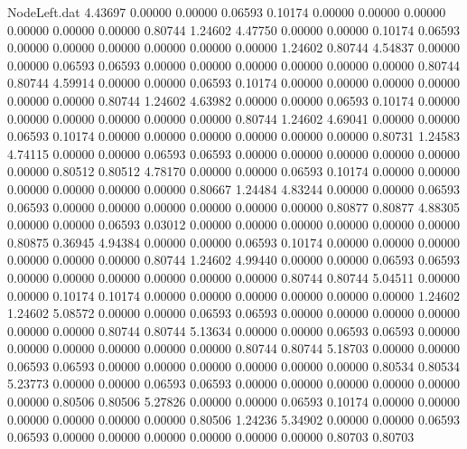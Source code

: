 \begin{filecontents}{NodeLeft.dat}
   4.43697    0.00000    0.00000     0.06593    0.10174    0.00000    0.00000    0.00000    0.00000    0.00000    0.00000    0.80744    1.24602
   4.47750    0.00000    0.00000     0.10174    0.06593    0.00000    0.00000    0.00000    0.00000    0.00000    0.00000    1.24602    0.80744
   4.54837    0.00000    0.00000     0.06593    0.06593    0.00000    0.00000    0.00000    0.00000    0.00000    0.00000    0.80744    0.80744
   4.59914    0.00000    0.00000     0.06593    0.10174    0.00000    0.00000    0.00000    0.00000    0.00000    0.00000    0.80744    1.24602
   4.63982    0.00000    0.00000     0.06593    0.10174    0.00000    0.00000    0.00000    0.00000    0.00000    0.00000    0.80744    1.24602
   4.69041    0.00000    0.00000     0.06593    0.10174    0.00000    0.00000    0.00000    0.00000    0.00000    0.00000    0.80731    1.24583
   4.74115    0.00000    0.00000     0.06593    0.06593    0.00000    0.00000    0.00000    0.00000    0.00000    0.00000    0.80512    0.80512
   4.78170    0.00000    0.00000     0.06593    0.10174    0.00000    0.00000    0.00000    0.00000    0.00000    0.00000    0.80667    1.24484
   4.83244    0.00000    0.00000     0.06593    0.06593    0.00000    0.00000    0.00000    0.00000    0.00000    0.00000    0.80877    0.80877
   4.88305    0.00000    0.00000     0.06593    0.03012    0.00000    0.00000    0.00000    0.00000    0.00000    0.00000    0.80875    0.36945
   4.94384    0.00000    0.00000     0.06593    0.10174    0.00000    0.00000    0.00000    0.00000    0.00000    0.00000    0.80744    1.24602
   4.99440    0.00000    0.00000     0.06593    0.06593    0.00000    0.00000    0.00000    0.00000    0.00000    0.00000    0.80744    0.80744
   5.04511    0.00000    0.00000     0.10174    0.10174    0.00000    0.00000    0.00000    0.00000    0.00000    0.00000    1.24602    1.24602
   5.08572    0.00000    0.00000     0.06593    0.06593    0.00000    0.00000    0.00000    0.00000    0.00000    0.00000    0.80744    0.80744
   5.13634    0.00000    0.00000     0.06593    0.06593    0.00000    0.00000    0.00000    0.00000    0.00000    0.00000    0.80744    0.80744
   5.18703    0.00000    0.00000     0.06593    0.06593    0.00000    0.00000    0.00000    0.00000    0.00000    0.00000    0.80534    0.80534
   5.23773    0.00000    0.00000     0.06593    0.06593    0.00000    0.00000    0.00000    0.00000    0.00000    0.00000    0.80506    0.80506
   5.27826    0.00000    0.00000     0.06593    0.10174    0.00000    0.00000    0.00000    0.00000    0.00000    0.00000    0.80506    1.24236
   5.34902    0.00000    0.00000     0.06593    0.06593    0.00000    0.00000    0.00000    0.00000    0.00000    0.00000    0.80703    0.80703

\end{filecontents}
